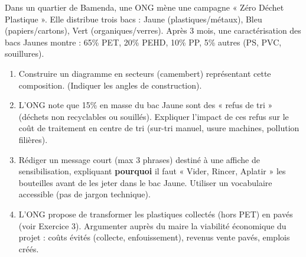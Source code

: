 \documentclass[11pt]{article}
\begin{document}
\begin{exercice}
Dans un quartier de Bamenda, une ONG mène une campagne « Zéro Déchet Plastique ». Elle distribue trois bacs : Jaune (plastiques/métaux), Bleu (papiers/cartons), Vert (organiques/verres). Après 3 mois, une caractérisation des bacs Jaunes montre : 65\% PET, 20\% PEHD, 10\% PP, 5\% autres (PS, PVC, souillures).
\begin{enumerate}
    \item Construire un diagramme en secteurs (camembert) représentant cette composition. (Indiquer les angles de construction).
    \item L'ONG note que 15\% en masse du bac Jaune sont des « refus de tri » (déchets non recyclables ou souillés). Expliquer l'impact de ces refus sur le coût de traitement en centre de tri (sur-tri manuel, usure machines, pollution filières).
    \item Rédiger un message court (max 3 phrases) destiné à une affiche de sensibilisation, expliquant \textbf{pourquoi} il faut « Vider, Rincer, Aplatir » les bouteilles avant de les jeter dans le bac Jaune. Utiliser un vocabulaire accessible (pas de jargon technique).
    \item L'ONG propose de transformer les plastiques collectés (hors PET) en pavés (voir Exercice 3). Argumenter auprès du maire la viabilité économique du projet : coûts évités (collecte, enfouissement), revenus vente pavés, emplois créés.
\end{enumerate}
\end{exercice}
\end{document}

